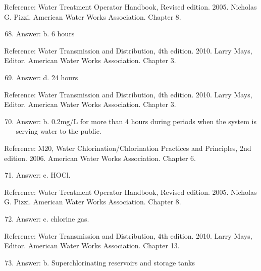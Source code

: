 \documentclass[10pt]{article}
\begin{document}
Reference: Water Treatment Operator Handbook, Revised edition. 2005. Nicholas G. Pizzi. American Water Works Association. Chapter 8.

\begin{enumerate}
  \setcounter{enumi}{67}
  \item Answer: b. 6 hours
\end{enumerate}

Reference: Water Transmission and Distribution, 4th edition. 2010. Larry Mays, Editor. American Water Works Association. Chapter 3.

\begin{enumerate}
  \setcounter{enumi}{68}
  \item Answer: d. 24 hours
\end{enumerate}

Reference: Water Transmission and Distribution, 4th edition. 2010. Larry Mays, Editor. American Water Works Association. Chapter 3.

\begin{enumerate}
  \setcounter{enumi}{69}
  \item Answer: b. $0.2 \mathrm{mg} / \mathrm{L}$ for more than 4 hours during periods when the system is serving water to the public.
\end{enumerate}

Reference: M20, Water Chlorination/Chlorination Practices and Principles, 2nd edition. 2006. American Water Works Association. Chapter 6.

\begin{enumerate}
  \setcounter{enumi}{70}
  \item Answer: c. $\mathrm{HOCl}$.
\end{enumerate}

Reference: Water Treatment Operator Handbook, Revised edition. 2005. Nicholas G. Pizzi. American Water Works Association. Chapter 8.

\begin{enumerate}
  \setcounter{enumi}{71}
  \item Answer: c. chlorine gas.
\end{enumerate}

Reference: Water Transmission and Distribution, 4th edition. 2010. Larry Mays, Editor. American Water Works Association. Chapter 13.

\begin{enumerate}
  \setcounter{enumi}{72}
  \item Answer: b. Superchlorinating reservoirs and storage tanks
\end{enumerate}
\end{document}

